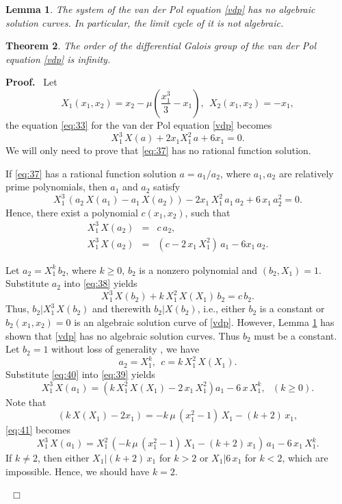 \documentclass[preprint, 12pt]{elsarticle}
\newtheorem{thm}{Theorem}[section]
\newtheorem{lem}[thm]{Lemma}
\numberwithin{equation}{section}
\newenvironment{proof}[1][Proof]{\textbf{#1.}\ }{\ $\Box$}
\begin{document}
\begin{lem} \cite{Cheng:95, Oda:95}
\label{lem:vdp} The system of the van der Pol equation \eqref{vdp} has no algebraic solution curves. In particular, the limit cycle of it is not algebraic.
\end{lem}

\begin{thm}
\label{cor:2} 
The order of the differential Galois group of the van der Pol equation \eqref{vdp} is
infinity.
\end{thm}
\begin{proof}
Let
$$X_1(x_1,x_2) = x_2 - \mu
(\dfrac{x_1^3}{3} - x_1),\ \ X_2(x_1,x_2) = -x_1,$$ 
the equation
\eqref{eq:33} for the van der Pol equation \eqref{vdp} becomes
\begin{equation}
\label{eq:37} X_1^3\,  X(a) + 2 x_1 X_1^2\,  a + 6 x_1 = 0.
\end{equation}
We will only need to prove that \eqref{eq:37} has no rational
function solution. 

If \eqref{eq:37} has a rational function
solution $a = a_1/a_2$, where $a_1, a_2$ are relatively prime
polynomials, then $a_1$ and $a_2$ satisfy
$$X_1^3\,(a_2\, X(a_1) - a_1\, X(a_2)) - 2 x_1\,X_1^2\,a_1\,a_2 + 6\, x_1\, a_2^2 = 0.$$
Hence, there exist a polynomial $c(x_1,x_2)$, such that
\begin{eqnarray}
\label{eq:38} X_1^3\, X(a_2) &=& c\, a_2,\\
\label{eq:39} X_1^3\, X(a_2) &=& (c - 2\, x_1\, X_1^2)\,a_1 - 6
x_1\,a_2.
\end{eqnarray}

Let $a_2 = X_1^k\, b_2$, where $k \geq 0$, $b_2$ is a nonzero
polynomial and $(b_2, X_1) = 1$. Substitute $a_2$ into
\eqref{eq:38} yields
$$X_1^3\, X(b_2) + k\,  X_1^2\,  X(X_1)\,  b_2 = c\,b_2.$$
Thus, $b_2| X_1^3\,  X(b_2)$ and therewith $b_2 | X(b_2)$, i.e.,
either $b_2$ is a constant or $b_2(x_1,x_2)=0$ is an algebraic solution curve of
\eqref{vdp}. However, Lemma \ref{lem:vdp} has shown that \eqref{vdp} 
has no algebraic solution curves. Thus $b_2$ must be a constant. Let $b_2 = 1$ without loss of generality , we have
\begin{equation}
\label{eq:40} a_2 = X_1^k,\ \ c = k\, X_1^2\, X(X_1).
\end{equation}
Substitute \eqref{eq:40} into \eqref{eq:39} yields
\begin{equation}
\label{eq:41} X_1^3\, X(a_1) = (k\,X_1^2\, X(X_1) - 2\, x_1\,
X_1^2) a_1 - 6\, x\, X_1^k,\ \ \ (k\geq 0).
\end{equation}
Note that
$$(k\, X(X_1) - 2 x_1) = -k\, \mu\, (x_1^2 - 1)\, X_1 - (k + 2)\, x_1,$$
\eqref{eq:41} becomes
$$X_1^3\, X(a_1) = X_1^2\,(-k\, \mu\, (x_1^2 - 1)\, X_1 - (k + 2)\, x_1)\, a_1 - 6\, x_1\, X_1^k.$$
If $k \not = 2$, then either $X_1|(k+2)\, x_1$ for $k > 2$ or $X_1| 6\,
x_1$ for $k < 2$, which are impossible. Hence, we should have $k
= 2$.


\end{proof}
\end{document}
